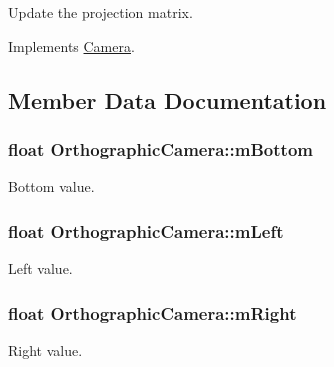 Update the projection matrix. 



Implements \hyperlink{class_camera_a199f2379e1a1603da6cca9fe0162626d}{Camera}.



\subsection{Member Data Documentation}
\hypertarget{class_orthographic_camera_aa901bf30589a77235d3b583d7a549ea0}{
\subsubsection[{m\+Bottom}]{\setlength{\rightskip}{0pt plus 5cm}float Orthographic\+Camera\+::m\+Bottom\hspace{0.3cm}{\ttfamily [private]}}}\label{class_orthographic_camera_aa901bf30589a77235d3b583d7a549ea0}


Bottom value. 

\hypertarget{class_orthographic_camera_a9a1ad18a4b2b39b4d3f7f09f53817d54}{
\subsubsection[{m\+Left}]{\setlength{\rightskip}{0pt plus 5cm}float Orthographic\+Camera\+::m\+Left\hspace{0.3cm}{\ttfamily [private]}}}\label{class_orthographic_camera_a9a1ad18a4b2b39b4d3f7f09f53817d54}


Left value. 

\hypertarget{class_orthographic_camera_a8ece912d753235b6f79f1607a19f892b}{
\subsubsection[{m\+Right}]{\setlength{\rightskip}{0pt plus 5cm}float Orthographic\+Camera\+::m\+Right\hspace{0.3cm}{\ttfamily [private]}}}\label{class_orthographic_camera_a8ece912d753235b6f79f1607a19f892b}


Right value. 


